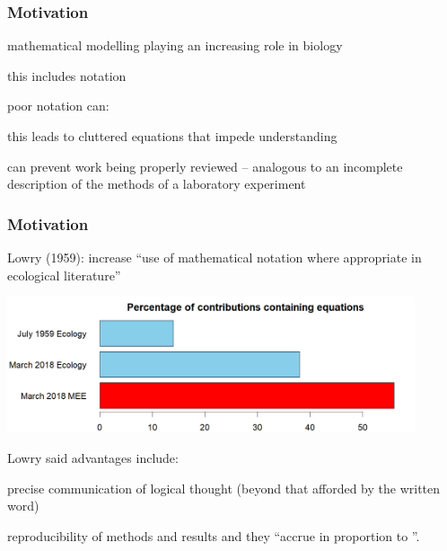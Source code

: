 

\begin{frame}
\frametitle{Motivation}
\bi
\item mathematical modelling playing an increasing role in biology
\item {}
\item this includes notation
\item {}
\pause
\item poor notation can:
  \bi
  \item {}
  \item this leads to cluttered equations that impede understanding
  \item {}
  \item can prevent work being properly reviewed -- analogous to an
      incomplete description of the methods of a laboratory experiment
  \ei
\ei
\end{frame}


\begin{frame}
\frametitle{Motivation}
Lowry (1959): increase ``use of mathematical notation where appropriate in ecological literature''

\begin{center}
  \includegraphics[height=4cm]{images/lowry.png}
\end{center}

Lowry said advantages include:
\bi
\item precise communication of logical thought (beyond that afforded by
  the written word)
\item reproducibility of methods and results
\ei
and they ``accrue in proportion to
''.
\end{frame}

